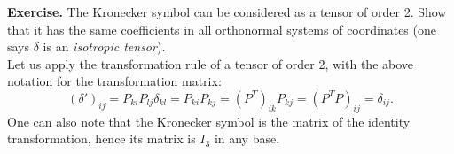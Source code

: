 \documentclass[DIV=12]{article}
\begin{document}
{\bf{Exercise.}} The Kronecker symbol can be considered as a tensor of order 2. Show that it 
 has the same coefficients in all orthonormal systems of coordinates (one says $\delta$ is an {\emph{isotropic tensor}}).\\

 Let us apply the transformation rule of a  tensor of order 2, with the above notation for
the transformation matrix:
\begin{equation}
 (\delta')_{ij} = P_{ki}P_{lj} \delta_{kl} = P_{ki} P_{kj} = (P^T)_{ik} P_{kj} = (P^TP)_{ij} = \delta_{ij}.
\end{equation}
One can also note that the Kronecker symbol is the matrix of the identity transformation,
 hence its matrix is $I_3$ in any base.


















\end{document}
